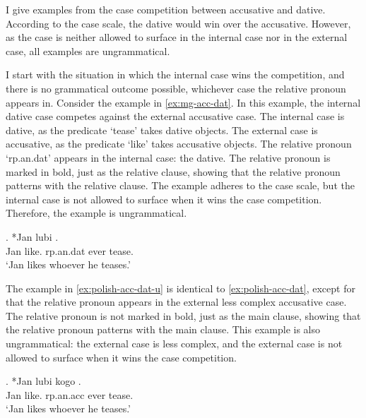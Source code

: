 I give examples from the case competition between accusative and dative. According to the case scale, the dative would win over the accusative. However, as the case is neither allowed to surface in the internal case nor in the external case, all examples are ungrammatical.

I start with the situation in which the internal case wins the competition, and there is no grammatical outcome possible, whichever case the relative pronoun appears in.
Consider the example in \ref{ex:mg-acc-dat}. In this example, the internal dative case competes against the external accusative case.
The internal case is dative, as the predicate  `tease' takes dative objects.
The external case is accusative, as the predicate  `like' takes accusative objects.
The relative pronoun  `\ac{rp}.\ac{an}.\ac{dat}' appears in the internal case: the dative. The relative pronoun is marked in bold, just as the relative clause, showing that the relative pronoun patterns with the relative clause.
The example adheres to the case scale, but the internal case is not allowed to surface when it wins the case competition. Therefore, the example is ungrammatical.

\exg. *Jan lubi   .\\
Jan like.\scsub{[acc]} \ac{rp}.\ac{an}.\ac{dat} ever tease.\scsub{[dat]}\\
`Jan likes whoever he teases.' \label{ex:polish-acc-dat}

The example in \ref{ex:polish-acc-dat-u} is identical to \ref{ex:polish-acc-dat}, except for that the relative pronoun appears in the external less complex accusative case.
The relative pronoun is not marked in bold, just as the main clause, showing that the relative pronoun patterns with the main clause.
This example is also ungrammatical: the external case is less complex, and the external case is not allowed to surface when it wins the case competition.

\exg. *Jan lubi kogo  .\\
Jan like.\scsub{[acc]} \ac{rp}.\ac{an}.\ac{acc} ever tease.\scsub{[dat]}\\
`Jan likes whoever he teases.' \label{ex:polish-acc-dat-u}

